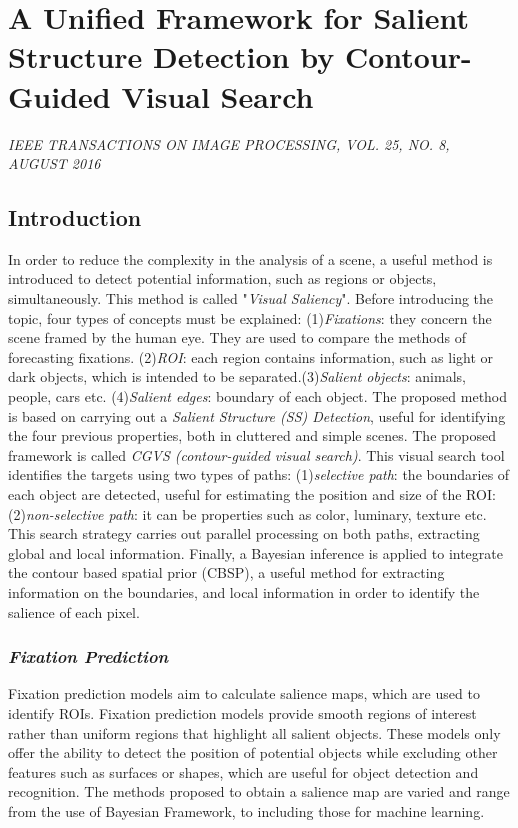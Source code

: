 \section{A Unified Framework for Salient Structure Detection by Contour-Guided Visual Search}

\begin{flushright}
    \author{
    Kai Fu Yang,
    Hui Li,
    Chao-Yi Li,
    and Young-Jie Li,
   \emph{Member}, 
    IEEE 
}
\end{flushright}

\begin{center}
    \emph{IEEE TRANSACTIONS ON IMAGE PROCESSING, VOL. 25, NO. 8, AUGUST 2016}
\end{center}

\subsection{Introduction}
In order to reduce the complexity in the analysis of a scene, a useful method 
is introduced to detect potential information, such as regions or 
objects, simultaneously. This method is called "\emph{Visual Saliency}". Before introducing
the topic, four types of concepts must be explained: (1)\emph{Fixations}: 
they concern the scene framed by the human eye. They are used to compare 
the methods of forecasting fixations. (2)\emph{ROI}: each region contains information, 
such as light or dark objects, which is intended to be separated.(3)\emph{Salient objects}: 
animals, people, cars etc. (4)\emph{Salient edges}: boundary of each object. The proposed 
method is based on carrying out a \emph{Salient Structure (SS) Detection},
useful for identifying the four previous properties, both in cluttered and 
simple scenes. The proposed framework is called \emph{CGVS (contour-guided visual 
search)}. This visual search tool identifies the targets using two types of 
paths: (1)\emph{selective path}: the boundaries of each object are detected, useful 
for estimating the position and size of the ROI: (2)\emph{non-selective path}: it 
can be properties such as color, luminary, texture etc. This search strategy 
carries out parallel processing on both paths, extracting global and local 
information. Finally, a Bayesian inference is applied to integrate the contour 
based spatial prior (CBSP), a useful method for extracting information on 
the boundaries, and local information in order to identify the salience of each 
pixel. 

\subsubsection{\emph{Fixation Prediction}}
Fixation prediction models aim to calculate salience maps, which are used to 
identify ROIs. Fixation prediction models provide smooth regions of interest 
rather than uniform regions that highlight all salient objects. These models 
only offer the ability to detect the position of potential objects while excluding 
other features such as surfaces or shapes, which are useful for object 
detection and recognition. The methods proposed to obtain a salience map 
are varied and range from the use of Bayesian Framework, to including those 
for machine learning. 